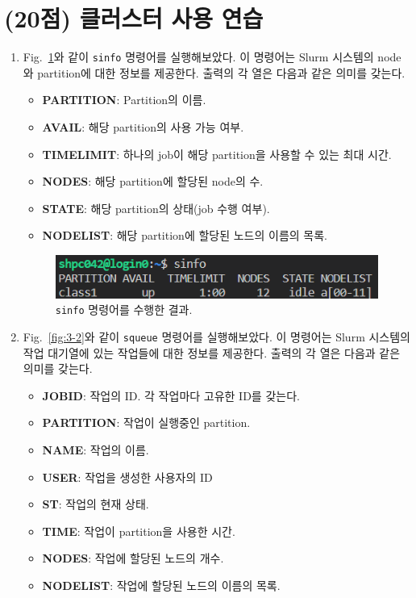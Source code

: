 \section{(20점) 클러스터 사용 연습}

\begin{enumerate}[label= (\alph*)]
    \item {
        Fig.~\ref{fig:3-1}와 같이 \texttt{sinfo} 명령어를 실행해보았다.
        이 명령어는 Slurm 시스템의 node와 partition에 대한 정보를 제공한다.
        출력의 각 열은 다음과 같은 의미를 갖는다.

        \begin{itemize}
            \item \textbf{PARTITION}: Partition의 이름.
            \item \textbf{AVAIL}: 해당 partition의 사용 가능 여부.
            \item \textbf{TIMELIMIT}: 하나의 job이 해당 partition을 사용할 수 있는 최대 시간.
            \item \textbf{NODES}: 해당 partition에 할당된 node의 수.
            \item \textbf{STATE}: 해당 partition의 상태(job 수행 여부).
            \item \textbf{NODELIST}: 해당 partition에 할당된 노드의 이름의 목록.
        \end{itemize}


        \begin{figure}
            \centering
            \includegraphics[scale=1]{imgs/Figure06_sinfo_trial.png}
            \caption{\label{fig:3-1}
                \texttt{sinfo} 명령어를 수행한 결과.
            }
        \end{figure}
    }

    \item {
        Fig.~\ref{fig:3-2}와 같이 \texttt{squeue} 명령어를 실행해보았다.
        이 명령어는 Slurm 시스템의 작업 대기열에 있는 작업들에 대한 정보를 제공한다.
        출력의 각 열은 다음과 같은 의미를 갖는다.

        \begin{itemize}
            \item \textbf{JOBID}: 작업의 ID. 각 작업마다 고유한 ID를 갖는다.
            \item \textbf{PARTITION}: 작업이 실행중인 partition.
            \item \textbf{NAME}: 작업의 이름.
            \item \textbf{USER}: 작업을 생성한 사용자의 ID
            \item \textbf{ST}: 작업의 현재 상태.
            \item \textbf{TIME}: 작업이 partition을 사용한 시간.
            \item \textbf{NODES}: 작업에 할당된 노드의 개수.
            \item \textbf{NODELIST}: 작업에 할당된 노드의 이름의 목록.
        \end{itemize}


}
\end{enumerate}
